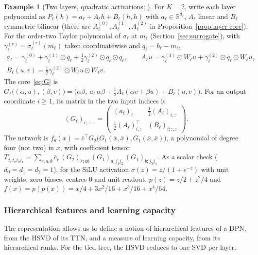 \documentclass[11pt]{article}
\newcommand{\R}{\mathbb{R}}
\newcommand{\xb}{\bar{x}}
\newcommand{\cb}{\bar{c}}
\theoremstyle{definition}
\newtheorem{example}[theorem]{Example}
\numberwithin{equation}{section}
\begin{document}
\begin{example}[Two layers, quadratic activations; {\citealp[Section~4]{hfl_local}}]\label{ex:quadratic}
For $K=2$, write each layer polynomial as $P_\ell(h)=a_\ell+A_\ell h+B_\ell(h,h)$ with $a_\ell\in\R^{d_\ell}$, $A_\ell$ linear and $B_\ell$ symmetric bilinear (these are $A_\ell^{(0)},A_\ell^{(1)},A_\ell^{(2)}$ in Proposition~\ref{prop:layer-core}). For the order-two Taylor polynomial of $\sigma_\ell$ at $m_\ell$ (Section~\ref{sec:surrogate}), with $\gamma^{(r)}_\ell=\sigma_\ell^{(r)}(m_\ell)$ taken coordinatewise and $q_\ell=b_\ell-m_\ell$,
\begin{gather*}
a_\ell=\gamma^{(0)}_\ell+\gamma^{(1)}_\ell\odot q_\ell+\tfrac12\gamma^{(2)}_\ell\odot q_\ell\odot q_\ell,\qquad
A_\ell u=\gamma^{(1)}_\ell\odot W_\ell u+\gamma^{(2)}_\ell\odot q_\ell\odot W_\ell u,\\
B_\ell(u,v)=\tfrac12\gamma^{(2)}_\ell\odot W_\ell u\odot W_\ell v .
\end{gather*}
The core~\eqref{eq:G} is $G_\ell\big((\alpha,u),(\beta,v)\big)=\big(\alpha\beta,\ a_\ell\,\alpha\beta+\tfrac12A_\ell(\alpha v+\beta u)+B_\ell(u,v)\big)$. For an output coordinate $i\ge1$, its matrix in the two input indices is
\[
(G_\ell)_{i;\,\cdot\,\cdot}=\begin{pmatrix}(a_\ell)_i&\tfrac12(A_\ell)_{i,:}\\[2pt]\tfrac12(A_\ell)_{i,:}^\top&(B_\ell)_{i;:,:}\end{pmatrix}.
\]
The network is $f_\theta(x)=\cb^\top G_2\big(G_1(\xb,\xb),G_1(\xb,\xb)\big)$, a polynomial of degree four (not two) in $x$, with coefficient tensor $T_{j_1j_2j_3j_4}=\sum_{r,a,b}\cb_r\,(G_2)_{r;ab}\,(G_1)_{a;j_1j_2}\,(G_1)_{b;j_3j_4}$. As a scalar check ($d_0=d_1=d_2=1$), for the SiLU activation $\sigma(z)=z/(1+e^{-z})$ with unit weights, zero biases, centres $0$ and unit readout, $p(z)=z/2+z^2/4$ and $f(x)=p(p(x))=x/4+3x^2/16+x^3/16+x^4/64$.
\end{example}

\subsubsection{Hierarchical features and learning capacity}\label{sec:features}

The representation allows us to define a notion of hierarchical features of a DPN, from the HSVD of its TTN, and a measure of learning capacity, from its hierarchical ranks. For the tied tree, the HSVD reduces to one SVD per layer.
\end{document}
